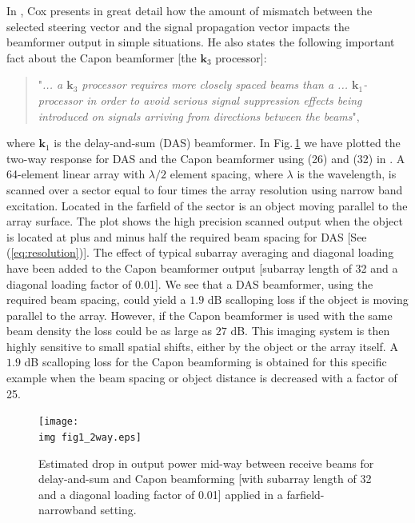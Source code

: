\documentclass[draftcls]{IEEEtran}
\newcommand{\mat}[1]{\mathbf{#1}}
\renewcommand{\vec}[1]{\mathbf{#1}}
\newcommand{\img}{img/}
\begin{document}
In \cite{Cox1973}, Cox presents in great detail how the amount of mismatch between the selected steering vector and the signal propagation vector impacts the beamformer output in simple situations. He also states the following important fact about the Capon beamformer [the $\vec{k}_3$ processor]: 
\begin{quote}
"\textit{... a $\vec{k}_3$ processor requires more closely spaced beams than a ... $\vec{k}_1$-processor in order to avoid serious signal suppression effects being introduced on signals arriving from directions between the beams}", 
\end{quote}
where $\vec{k}_1$ is the delay-and-sum (DAS) beamformer. In Fig.\,\ref{fig:das_capon_beams} we have plotted the two-way response for DAS and the Capon beamformer using (26) and (32) in \cite{Cox1973}. A 64-element linear array with $\lambda/2$ element spacing, where $\lambda$ is the wavelength, is scanned over a sector equal to four times the array resolution using narrow band excitation. Located in the farfield of the sector is an object moving parallel to the array surface. The plot shows the high precision scanned output when the object is located at plus and minus half the required beam spacing for DAS [See (\ref{eq:resolution})]. %
The effect of typical subarray averaging and diagonal loading have been added to the Capon beamformer output [subarray length of 32 and a diagonal loading factor of 0.01]. We see that a DAS beamformer, using the required beam spacing, could yield a $1.9$ dB scalloping loss \cite{Harris1978} if the object is moving parallel to the array. However, if the Capon beamformer is used with the same beam density the loss could be as large as $27$ dB. This imaging system is then highly sensitive to small spatial shifts, either by the object or the array itself. A $1.9$ dB scalloping loss for the Capon beamforming is obtained for this specific example when the beam spacing or object distance is decreased with a factor of 25. 

\begin{figure}[!t]
\centerline{
\texttt{[image: \\img fig1\_2way.eps]}
}
\caption{Estimated drop in output power mid-way between receive beams for delay-and-sum and Capon beamforming [with subarray length of 32 and a diagonal loading factor of 0.01] applied in a farfield-narrowband setting. %
}
\label{fig:das_capon_beams}
\end{figure}
\end{document}
